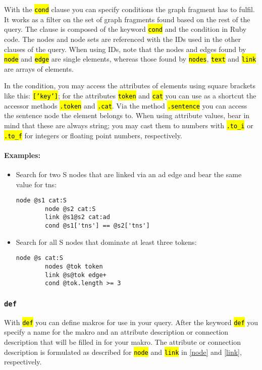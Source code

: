 \documentclass[12pt]{scrartcl}
\newcommand{\code}[1]{\hl{\texttt{#1}}}
\begin{document}
With the \code{cond} clause you can specify conditions the graph fragment has to fulfil.
It works as a filter on the set of graph fragments found based on the rest of the query.
The clause is composed of the keyword \code{cond} and the condition in Ruby code.
The nodes and node sets are referenced with the IDs used in the other clauses of the query.
When using IDs, note that the nodes and edges found by \code{node} and \code{edge} are single elements, whereas those found by \code{nodes}, \code{text} and \code{link} are arrays of elements.

In the condition, you may access the attributes of elements using square brackets like this: \code{['key']}; for the attributes \code{token} and \code{cat} you can use as a shortcut the accessor methods \code{.token} and \code{.cat}.
Via the method \code{.sentence} you can access the sentence node the element belongs to.
When using attribute values, bear in mind that these are always string; you may cast them to numbers with \code{.to\_i} or \code{.to\_f} for integers or floating point numbers, respectively.


\paragraph*{Examples:}
\begin{itemize}
	\item Search for two S nodes that are linked via an ad edge and bear the same value for tns:
	\begin{lstlisting}[gobble=8,aboveskip=.6em,belowskip=.2em]
		node @s1 cat:S
		node @s2 cat:S
		link @s1@s2 cat:ad
		cond @s1['tns'] == @s2['tns']
	\end{lstlisting}
	\item Search for all S nodes that dominate at least three tokens:
	\begin{lstlisting}[gobble=8,aboveskip=.6em,belowskip=.2em]
		node @s cat:S
		nodes @tok token
		link @s@tok edge+
		cond @tok.length >= 3
	\end{lstlisting}
\end{itemize}


\subsubsection{\texttt{def}}\label{def}

With \code{def} you can define makros for use in your query.
After the keyword \code{def} you specify a name for the makro and an attribute description or connection description that will be filled in for your makro.
The attribute or connection description is formulated as described for \code{node} and \code{link} in \ref{node} and \ref{link}, respectively.
\end{document}
